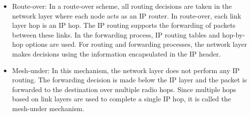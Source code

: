 \documentclass[11pt,draftclsnofoot,onecolumn]{IEEEtran}
\begin{document}
\begin{itemize}
\item Route-over: In a route-over scheme, all routing decisions are taken in the network layer where each node acts as an IP router. In route-over, each link layer hop is an IP hop. The IP routing supports the forwarding of packets between these links. In the forwarding process, IP routing tables and hop-by-hop options are used. For routing and forwarding processes, the network layer makes decisions using the information encapsulated in the IP header. %

\item Mesh-under: In this mechanism, the network layer does not perform any IP routing. The forwarding decision is made below the IP layer and the packet is forwarded to the destination over multiple radio hops. %
Since multiple hops based on link layers are used to complete a single IP hop, it is called the mesh-under mechanism. %
\end{itemize}
\end{document}
